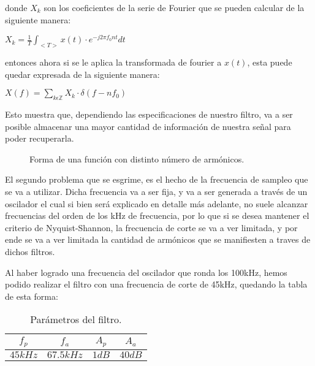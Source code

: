 \documentclass[../../ASSD_TP1_G7.tex]{subfiles}
\begin{document}
donde $X_{k}$ son los coeficientes de la serie de Fourier que se
pueden calcular de la siguiente manera:
\begin{center}
\textit{\Large{}$X_{k}=\frac{1}{T}\int_{<T>}x(t)\cdot e^{-j2\pi f_{0}nt}dt$}{\Large\par}
\par\end{center}

entonces ahora si se le aplica la transformada de fourier a $x(t)$,
esta puede quedar expresada de la siguiente manera:
\begin{center}
\textit{\Large{}$X(f)=\sum_{k\epsilon\mathbb{Z}}X_{k}\cdot\delta(f-nf_{0})$}{\Large\par}
\par\end{center}

Esto muestra que, dependiendo las especificaciones de nuestro filtro,
va a ser posible almacenar una mayor cantidad de información de nuestra
señal para poder recuperarla. 

\begin{figure}[H]

\caption{Forma de una función con distinto número de armónicos.}

\end{figure}

El segundo problema que se esgrime, es el hecho de la frecuencia de
sampleo que se va a utilizar. Dicha frecuencia va a ser fija, y va
a ser generada a través de un oscilador el cual si bien será explicado
en detalle más adelante, no suele alcanzar frecuencias del orden de
los kHz de frecuencia, por lo que si se desea mantener el criterio
de Nyquist-Shannon, la frecuencia de corte se va a ver limitada, y
por ende se va a ver limitada la cantidad de armónicos que se manifiesten
a traves de dichos filtros.

Al haber logrado una frecuencia del oscilador que ronda los 100kHz,
hemos podido realizar el filtro con una frecuencia de corte de 45kHz,
quedando la tabla de esta forma:

\begin{table}[H]

\begin{centering}
\begin{tabular}{|c|c|c|c|}
\hline 
$f_{p}$ & $f_{a}$ & $A_{p}$ & $A_{a}$\\
\hline 
\hline 
$45kHz$ & $67.5kHz$ & $1dB$ & $40dB$\\
\hline 
\end{tabular}\caption{Parámetros del filtro.}
\par\end{centering}
\end{table}
\end{document}
